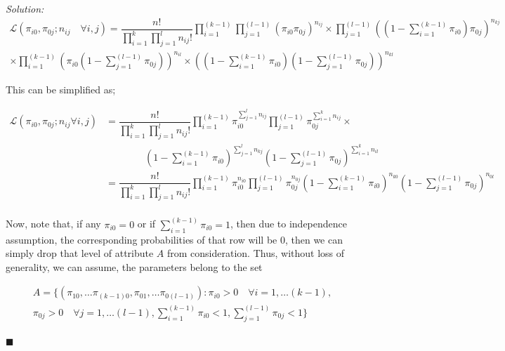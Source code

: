 \documentclass[12pt]{article}
\theoremstyle{definition}
\newenvironment{answer}{\textit{Solution: }\quad }{ \hfill $\blacksquare$}
\numberwithin{equation}{section}
\begin{document}
\begin{answer}
    \begin{multline*}
            \mathcal{L}(\pi_{i0}, \pi_{0j}; n_{ij} \quad \forall i, j)
            = \dfrac{n!}{\prod_{i=1}^{k} \prod_{j=1}^{l} n_{ij}! } \prod_{i=1}^{(k-1)} \prod_{j=1}^{(l-1)} (\pi_{i0}\pi_{0j})^{n_{ij}} \times
            \prod_{j=1}^{(l-1)} \left( \left(1 - \sum_{i=1}^{(k-1)}\pi_{i0}\right) \pi_{0j} \right)^{n_{kj}}\\ 
            \times \prod_{i=1}^{(k-1)} \left( \pi_{i0} \left(1 - \sum_{j=1}^{(l-1)}\pi_{0j}\right) \right)^{n_{il}} \times
            \left( \left(1 - \sum_{i=1}^{(k-1)}\pi_{i0}\right) \left(1 - \sum_{j=1}^{(l-1)}\pi_{0j}\right) \right)^{n_{kl}}
    \end{multline*}
    
    This can be simplified as;

    \begin{align*}
        \mathcal{L}(\pi_{i0}, \pi_{0j}; n_{ij} \forall i, j)
        & = \dfrac{n!}{\prod_{i=1}^{k} \prod_{j=1}^{l} n_{ij}! } \prod_{i=1}^{(k-1)} \pi_{i0}^{\sum_{j = 1}^{l} n_{ij}} \prod_{j=1}^{(l-1)} \pi_{0j}^{\sum_{i = 1}^{k} n_{ij}} \times \\
        & \qquad \qquad \left(1 - \sum_{i=1}^{(k-1)}\pi_{i0}\right)^{\sum_{j = 1}^{l} n_{kj}} \left(1 - \sum_{j=1}^{(l-1)}\pi_{0j}\right)^{\sum_{i = 1}^{k} n_{il}}\\
        & = \dfrac{n!}{\prod_{i=1}^{k} \prod_{j=1}^{l} n_{ij}! } \prod_{i=1}^{(k-1)} \pi_{i0}^{n_{i0}} \prod_{j=1}^{(l-1)} \pi_{0j}^{n_{0j}} \left(1 - \sum_{i=1}^{(k-1)}\pi_{i0}\right)^{n_{k0}} \left(1 - \sum_{j=1}^{(l-1)}\pi_{0j}\right)^{n_{0l}}\\
    \end{align*}

    Now, note that, if any $\pi_{i0} = 0$ or if $\sum_{i=1}^{(k-1)} \pi_{i0} = 1$, then due to independence assumption, the corresponding probabilities of that row will be 0, then we can simply drop that level of attribute $A$ from consideration. Thus, without loss of generality, we can assume, the parameters belong to the set

    \begin{equation*}
        \begin{split}
            A = \Bigg\{ (\pi_{10}, \dots \pi_{(k-1)0}, \pi_{01}, \dots \pi_{0(l-1)}) : \pi_{i0} > 0 \quad \forall i = 1, \dots (k-1), \\
             \pi_{0j} > 0 \quad \forall j = 1, \dots (l-1), 
            \sum_{i=1}^{(k-1)} \pi_{i0} < 1, \sum_{j=1}^{(l-1)} \pi_{0j} < 1 \Bigg\}            
        \end{split}
    \end{equation*}


\end{answer}
\end{document}

